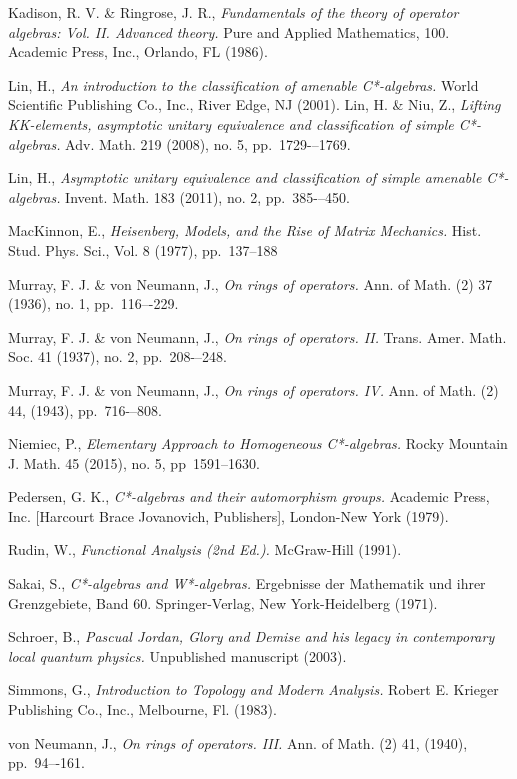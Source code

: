 \documentclass[12pt,a4paper]{report}
\theoremstyle{plain}
\theoremstyle{definition}
\newcommand{\1}{\mathbbm{1}}
\begin{document}
\begin{thebibliography}{00}
	Kadison, R. V. \& Ringrose, J. R.,
	\emph{Fundamentals of the theory of operator algebras: Vol. II. Advanced theory.}
	Pure and Applied Mathematics, 100. Academic Press, Inc., Orlando, FL (1986).
	
	Lin, H.,
	\emph{An introduction to the classification of amenable C*-algebras.}
	World Scientific Publishing Co., Inc., River Edge, NJ (2001).
	Lin, H. \& Niu, Z.,
	\emph{Lifting KK-elements, asymptotic unitary equivalence and classification of simple C*-algebras.}
	Adv. Math. 219 (2008), no. 5, pp.~1729-–1769. 
	
	Lin, H.,
	\emph{Asymptotic unitary equivalence and classification of simple amenable C*-algebras.}
	Invent. Math. 183 (2011), no. 2, pp.~385-–450. 

	MacKinnon, E.,
	\emph{Heisenberg, Models, and the Rise of Matrix Mechanics.}
	Hist. Stud. Phys. Sci., Vol. 8 (1977), pp.~137--188
	
	Murray, F. J. \& von Neumann, J.,
	\emph{On rings of operators.}
	Ann. of Math. (2) 37 (1936), no. 1, pp.~116–-229.

	Murray, F. J. \& von Neumann, J.,
	\emph{On rings of operators. II.}
	Trans. Amer. Math. Soc. 41 (1937), no. 2, pp.~208-–248. 

	Murray, F. J. \& von Neumann, J.,
	\emph{On rings of operators. IV.}
	Ann. of Math. (2) 44, (1943), pp.~716-–808.
	
	Niemiec, P.,
	\emph{Elementary Approach to Homogeneous C*-algebras.}
	Rocky Mountain J. Math. 45 (2015), no. 5, pp~1591--1630.	
	
	Pedersen, G. K.,
	\emph{C*-algebras and their automorphism groups.}
	Academic Press, Inc. [Harcourt Brace Jovanovich, Publishers], London-New York (1979).

	Rudin, W.,
	\emph{Functional Analysis (2nd Ed.).}
	McGraw-Hill (1991).

	Sakai, S.,
	\emph{C*-algebras and W*-algebras.}
	Ergebnisse der Mathematik und ihrer Grenzgebiete, Band 60. Springer-Verlag, New York-Heidelberg (1971).

	Schroer, B.,
	\emph{Pascual Jordan, Glory and Demise and his legacy in contemporary local quantum physics.}
	Unpublished manuscript (2003).
	
	Simmons, G.,
	\emph{Introduction to Topology and Modern Analysis.}
	Robert E. Krieger Publishing Co., Inc., Melbourne, Fl. (1983).

	von Neumann, J.,
	\emph{On rings of operators. III.}
	Ann. of Math. (2) 41, (1940), pp.~94–-161.

	
\end{thebibliography}
\end{document}
